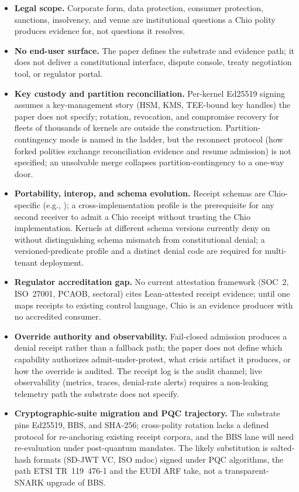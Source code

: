 \begin{itemize}[noitemsep,topsep=2pt,leftmargin=1.2em]
  \item \textbf{Legal scope.} Corporate form, data protection, consumer protection, sanctions, insolvency, and venue are institutional questions a Chio polity produces evidence for, not questions it resolves.
  \item \textbf{No end-user surface.} The paper defines the substrate and evidence path; it does not deliver a constitutional interface, dispute console, treaty negotiation tool, or regulator portal.
  \item \textbf{Key custody and partition reconciliation.} Per-kernel Ed25519 signing assumes a key-management story (HSM, KMS, TEE-bound key handles) the paper does not specify; rotation, revocation, and compromise recovery for fleets of thousands of kernels are outside the construction. Partition-contingency mode is named in the ladder, but the reconnect protocol (how forked polities exchange reconciliation evidence and resume admission) is not specified; an unsolvable merge collapses partition-contingency to a one-way door.
  \item \textbf{Portability, interop, and schema evolution.} Receipt schemas are Chio-specific (e.g., ); a cross-implementation profile is the prerequisite for any second receiver to admit a Chio receipt without trusting the Chio implementation. Kernels at different schema versions currently deny on  without distinguishing schema mismatch from constitutional denial; a versioned-predicate profile and a distinct  denial code are required for multi-tenant deployment.
  \item \textbf{Regulator accreditation gap.} No current attestation framework (SOC~2, ISO~27001, PCAOB, sectoral) cites Lean-attested receipt evidence; until one maps receipts to existing control language, Chio is an evidence producer with no accredited consumer.
  \item \textbf{Override authority and observability.} Fail-closed admission produces a denial receipt rather than a fallback path; the paper does not define which capability authorizes admit-under-protest, what crisis artifact it produces, or how the override is audited. The receipt log is the audit channel; live observability (metrics, traces, denial-rate alerts) requires a non-leaking telemetry path the substrate does not specify.
  \item \textbf{Cryptographic-suite migration and PQC trajectory.} The substrate pins Ed25519, BBS, and SHA-256; cross-polity rotation lacks a defined protocol for re-anchoring existing receipt corpora, and the BBS lane will need re-evaluation under post-quantum mandates. The likely substitution is salted-hash formats (SD-JWT VC, ISO mdoc) signed under PQC algorithms, the path ETSI TR~119~476-1 and the EUDI ARF take, not a transparent-SNARK upgrade of BBS.
\end{itemize}
